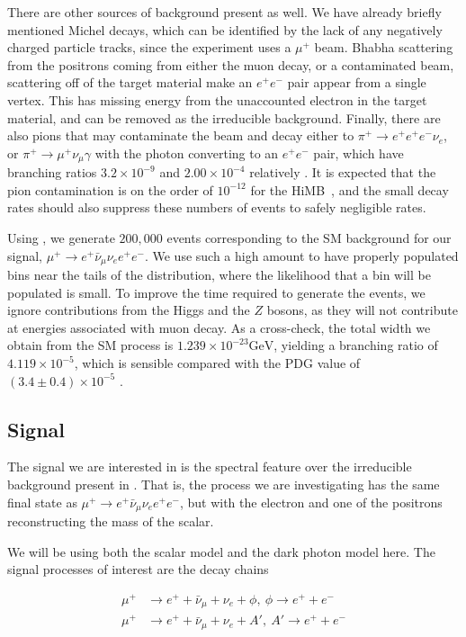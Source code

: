 There are other sources of background present as well.
We have already briefly mentioned Michel decays, which can be identified by the lack of any negatively charged particle tracks, since the experiment uses a $\mu^+$ beam.
Bhabha scattering from the positrons coming from either the muon decay, or a contaminated beam, scattering off of the target material make an $e^+ e^-$ pair appear from a single vertex.
This has missing energy from the unaccounted electron in the target material, and can be removed as the irreducible background.
Finally, there are also pions that may contaminate the beam and decay either to $\pi^+ \rightarrow e^+ e^+ e^- \nu_e$, or $\pi^+ \rightarrow \mu^+ \nu_\mu \gamma$ with the photon converting to an $e^+ e^-$ pair, which have branching ratios $3.2 \times 10^{-9}$ and $2.00 \times 10^{-4}$ relatively \cite{Agashe:2014kda}.
It is expected that the pion contamination is on the order of $10^{-12}$ for the HiMB~\cite{Blondel:2013ia}, and the small decay rates should also suppress these numbers of events to safely negligible rates.

Using \madgraph, we generate $200,000$ events corresponding to the SM background for our signal, $\mu^+ \rightarrow e^+ \bar{\nu}_\mu \nu_e e^+ e^-$.
We use such a high amount to have properly populated bins near the tails of the distribution, where the likelihood that a bin will be populated is small.
To improve the time required to generate the events, we ignore contributions from the Higgs and the $Z$ bosons, as they will not contribute at energies associated with muon decay.
As a cross-check, the total width we obtain from the SM process is $1.239\times 10^{-23}\textrm{GeV}$, yielding a branching ratio of $4.119\times 10^{-5}$, which is sensible compared with the PDG value of $(3.4 \pm 0.4) \times 10^{-5}$ \cite{Agashe:2014kda}.

\subsection{Signal}
The signal we are interested in is the spectral feature over the irreducible background present in \mueee.
That is, the process we are investigating has the same final state as $\mu^+ \rightarrow e^+ \bar{\nu}_\mu \nu_e e^+ e^-$, but with the electron and one of the positrons reconstructing the mass of the scalar.

We will be using both the scalar model and the dark photon model here.
The signal processes of interest are the decay chains

\begin{align}
    \mu^+ & \rightarrow e^+ + \bar{\nu}_\mu + \nu_e + \phi,~\phi \rightarrow e^+ + e^- \\
    \mu^+ & \rightarrow e^+ + \bar{\nu}_\mu + \nu_e + A',~A' \rightarrow e^+ + e^-
\end{align}

